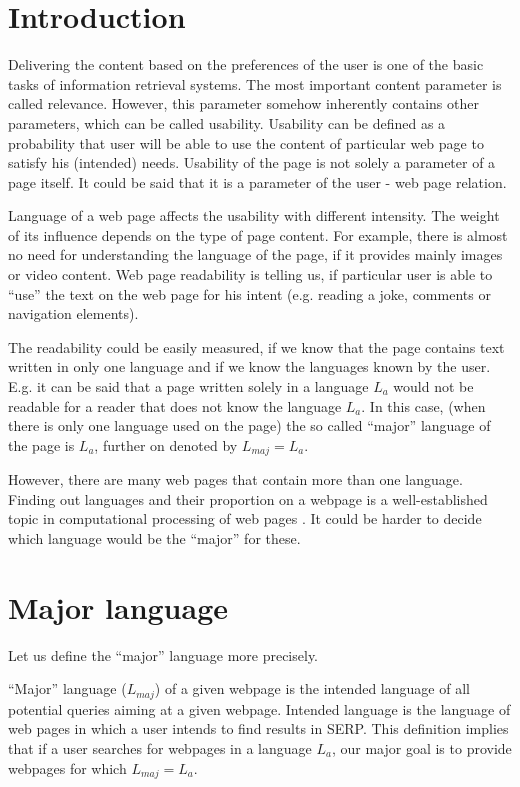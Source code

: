 \documentclass{acm_proc_article-sp}
\begin{document}
\section{Introduction}
  Delivering the content based on the preferences of the user is one of the basic tasks of information retrieval systems.
  The most important content parameter is called relevance. 
  However, this parameter somehow inherently contains other parameters, which can be called usability.
  Usability can be defined as a probability that user will be able to use the content of particular 
  web page to satisfy his (intended) needs.
  Usability of the page is not solely a parameter of a page itself.
  It could be said that it is a parameter of the user - web page relation.

  Language of a web page affects the usability with different intensity. 
  The weight of its influence depends on the type of page content.
  For example, there is almost no need for understanding the language of the page, if it provides mainly images or video content.
  Web page readability is telling us, if particular user is able to
  ``use'' the text on the web page for his intent (e.g. reading a joke, comments or navigation elements).
 

  The readability could be easily measured, if we know that the page contains text written in only one language 
  and if we know the languages known by the user.
  E.g. it can be said that a page written solely in a language $L_a$ would not be readable for a reader 
  that does not know the language $L_a$. 
  In this case, (when there is only one language used on the page) 
  the so called ``major'' language of the page is $L_a$, further on denoted by $L_{maj} = L_a$.
  
  However, there are many web pages that contain more than one language.
  Finding out languages and their proportion on a webpage is a well-established topic in computational processing of 
  web pages \cite{ Baldwin:shortlong, Campbell:supportvector, trenkle:ngram, Martins:langidentweb, Rehurek:languageidentification}.
  It could be harder to decide which language would be the ``major'' for these.
 
  \section{Major language}
  
  Let us define the ``major'' language more precisely. 
  
  ``Major'' language ($L_{maj}$) of a given webpage is the intended language of all potential queries aiming at a given webpage.
  Intended language is the language of web pages in which a user intends to find results in SERP. 
  This definition implies that if a user searches for webpages in a language $L_a$, 
  our major goal is to provide webpages for which $L_{maj} = L_a$.
  
\end{document}
